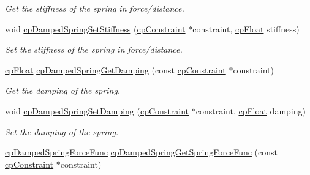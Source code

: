 \begin{DoxyCompactItemize}
\begin{DoxyCompactList}\small\item\em Get the stiffness of the spring in force/distance. \end{DoxyCompactList}\item 
\hypertarget{group__cp_damped_spring_gaf18a8cc833e01635084c66ef656b13f6}{}void \hyperlink{group__cp_damped_spring_gaf18a8cc833e01635084c66ef656b13f6}{cp\+Damped\+Spring\+Set\+Stiffness} (\hyperlink{structcp_constraint}{cp\+Constraint} $\ast$constraint, \hyperlink{group__basic_types_gac1ed65573e035bf892505768c852d8d3}{cp\+Float} stiffness)\label{group__cp_damped_spring_gaf18a8cc833e01635084c66ef656b13f6}

\begin{DoxyCompactList}\small\item\em Set the stiffness of the spring in force/distance. \end{DoxyCompactList}\item 
\hypertarget{group__cp_damped_spring_ga63dae7d57342faa212aa1d54153fabf2}{}\hyperlink{group__basic_types_gac1ed65573e035bf892505768c852d8d3}{cp\+Float} \hyperlink{group__cp_damped_spring_ga63dae7d57342faa212aa1d54153fabf2}{cp\+Damped\+Spring\+Get\+Damping} (const \hyperlink{structcp_constraint}{cp\+Constraint} $\ast$constraint)\label{group__cp_damped_spring_ga63dae7d57342faa212aa1d54153fabf2}

\begin{DoxyCompactList}\small\item\em Get the damping of the spring. \end{DoxyCompactList}\item 
\hypertarget{group__cp_damped_spring_ga026aea0eff634138c52d2c73b9fb1c06}{}void \hyperlink{group__cp_damped_spring_ga026aea0eff634138c52d2c73b9fb1c06}{cp\+Damped\+Spring\+Set\+Damping} (\hyperlink{structcp_constraint}{cp\+Constraint} $\ast$constraint, \hyperlink{group__basic_types_gac1ed65573e035bf892505768c852d8d3}{cp\+Float} damping)\label{group__cp_damped_spring_ga026aea0eff634138c52d2c73b9fb1c06}

\begin{DoxyCompactList}\small\item\em Set the damping of the spring. \end{DoxyCompactList}\item 
\hypertarget{group__cp_damped_spring_ga5f0273716bb0cfa4d2cedf29eb0ade4f}{}\hyperlink{group__cp_damped_spring_gad88d8466e0057d4ad05183fb14fa274d}{cp\+Damped\+Spring\+Force\+Func} \hyperlink{group__cp_damped_spring_ga5f0273716bb0cfa4d2cedf29eb0ade4f}{cp\+Damped\+Spring\+Get\+Spring\+Force\+Func} (const \hyperlink{structcp_constraint}{cp\+Constraint} $\ast$constraint)\label{group__cp_damped_spring_ga5f0273716bb0cfa4d2cedf29eb0ade4f}


\end{DoxyCompactItemize}
